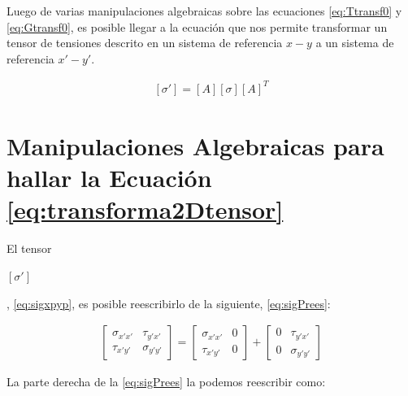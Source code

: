 \documentclass[12pt,letterpaper, twoside, openany]{article}
\begin{document}
%
Luego de varias manipulaciones algebraicas sobre las ecuaciones \ref{eq:Ttransf0} y \ref{eq:Gtransf0}, es posible llegar a la ecuación que nos permite transformar un tensor de tensiones descrito en un sistema de referencia $x-y$ a un sistema de referencia $x'-y'$.
%
\begin{large}
	\begin{align}
		\left[ \sigma' \right] = \left[ A \right] \left[ \sigma \right] \left[ A \right]^T 
		\label{eq:transforma2Dtensor}
	\end{align}
\end{large}
%
\newpage
\section{Manipulaciones Algebraicas para hallar la Ecuación \ref{eq:transforma2Dtensor}}
%
El tensor \begin{large} $\left[ \sigma' \right]$\end{large}, \cref{eq:sigxpyp}, es posible reescribirlo de la siguiente, \cref{eq:sigPrees}:
%
\begin{large}
	\begin{align}
		\left[ \begin{array}{cc}
		\sigma_{x'x'} & \tau_{y'x'} \\  
		\tau_{x'y'} & \sigma_{y'y'}
		\end{array}  \right]=
		\left[ \begin{array}{cc}
		\sigma_{x'x'} & 0 \\  
		\tau_{x'y'} & 0
		\end{array}  \right] +
		\left[ \begin{array}{cc}
		0 & \tau_{y'x'} \\  
		0 & \sigma_{y'y'}
		\end{array}  \right]
		\label{eq:sigPrees}
	\end{align}
\end{large}
%
La parte derecha de la \cref{eq:sigPrees} la podemos reescribir como:
%
\end{document}
